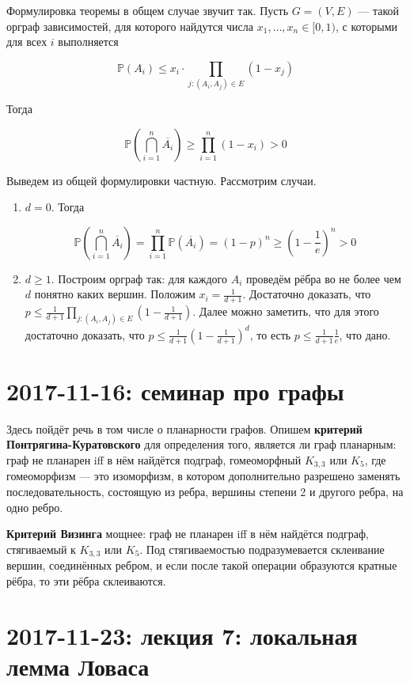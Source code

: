 \documentclass[12pt]{article}
\renewcommand{\P}{\mathbb{P}}
\begin{document}
Формулировка теоремы в общем случае звучит так. Пусть $G = (V, E)$ — такой орграф зависимостей, для которого найдутся числа $x_1, \ldots, x_n \in [0, 1)$, с которыми для всех $i$ выполняется

\[
\P(A_i) \leq x_i \cdot \prod_{j \colon (A_i, A_j) \in E} (1 - x_j)
\]

Тогда 

\[
\P \left( \bigcap_{i=1}^n \overline{A_i} \right) \geq \prod_{i=1}^n (1 - x_i) > 0
\]

Выведем из общей формулировки частную. Рассмотрим случаи.

\begin{enumerate}
\item $d = 0$. Тогда

\[
\P \left( \bigcap_{i=1}^n \overline{A_i} \right) = \prod_{i=1}^n \P(\overline{A_i}) = (1 - p)^n \geq \left( 1 - \frac 1 e \right)^n > 0
\]

\item $d \geq 1$. Построим орграф так: для каждого $A_i$ проведём рёбра во не более чем $d$ понятно каких вершин. Положим $x_i = \frac 1 {d + 1}$. Достаточно доказать, что $p \leq \frac 1 {d+1} \prod_{j \colon (A_i, A_j) \in E} \left( 1 - \frac 1 {d + 1} \right)$. Далее можно заметить, что для этого достаточно доказать, что $p \leq \frac 1 {d+1} \left( 1 - \frac 1 {d+1} \right)^d$, то есть $p \leq \frac 1 {d+1} \frac 1 e$, что дано.
\end{enumerate}

\section{2017-11-16: семинар про графы}

Здесь пойдёт речь в том числе о планарности графов. Опишем \textbf{критерий Понтрягина-Куратовского} для определения того, является ли граф планарным: граф не планарен iff в нём найдётся подграф, гомеоморфный $K_{3, 3}$ или $K_5$, где гомеоморфизм — это изоморфизм, в котором дополнительно разрешено заменять последовательность, состоящую из ребра, вершины степени 2 и другого ребра, на одно ребро.

\textbf{Критерий Визинга} мощнее: граф не планарен iff в нём найдётся подграф, стягиваемый к $K_{3, 3}$ или $K_5$. Под стягиваемостью подразумевается склеивание вершин, соединённых ребром, и если после такой операции образуются кратные рёбра, то эти рёбра склеиваются.

\section{2017-11-23: лекция 7: локальная лемма Ловаса}
\end{document}
